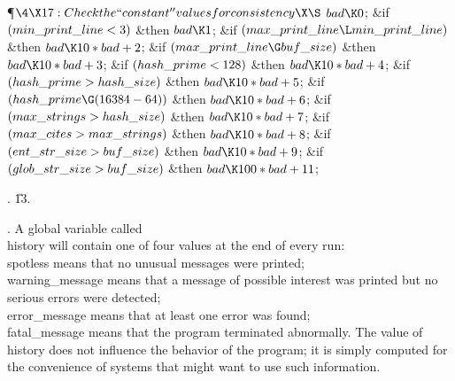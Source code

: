 \Y\P$\4\X17:Check the ``constant'' values for consistency\X\S$\6
$\\{bad}\K0$;\6
\&{if} $(\\{min\_print\_line}<3)$ \1\&{then}\5
$\\{bad}\K1$;\2\6
\&{if} $(\\{max\_print\_line}\L\\{min\_print\_line})$ \1\&{then}\5
$\\{bad}\K10\ast\\{bad}+2$;\2\6
\&{if} $(\\{max\_print\_line}\G\\{buf\_size})$ \1\&{then}\5
$\\{bad}\K10\ast\\{bad}+3$;\2\6
\&{if} $(\\{hash\_prime}<128)$ \1\&{then}\5
$\\{bad}\K10\ast\\{bad}+4$;\2\6
\&{if} $(\\{hash\_prime}>\\{hash\_size})$ \1\&{then}\5
$\\{bad}\K10\ast\\{bad}+5$;\2\6
\&{if} $(\\{hash\_prime}\G(16384-64))$ \1\&{then}\5
$\\{bad}\K10\ast\\{bad}+6$;\2\6
\&{if} $(\\{max\_strings}>\\{hash\_size})$ \1\&{then}\5
$\\{bad}\K10\ast\\{bad}+7$;\2\6
\&{if} $(\\{max\_cites}>\\{max\_strings})$ \1\&{then}\5
$\\{bad}\K10\ast\\{bad}+8$;\2\6
\&{if} $(\\{ent\_str\_size}>\\{buf\_size})$ \1\&{then}\5
$\\{bad}\K10\ast\\{bad}+9$;\2\6
\&{if} $(\\{glob\_str\_size}>\\{buf\_size})$ \1\&{then}\5
$\\{bad}\K100\ast\\{bad}+11$;\2\par
{}.
\U13.\fi

.
A global variable called \\{history} will contain one of four values at
the end of every run: \\{spotless} means that no unusual messages were
printed; \\{warning\_message} means that a message of possible interest
was printed but no serious errors were detected; \\{error\_message} means
that at least one error was found; \\{fatal\_message} means that the
program terminated abnormally. The value of \\{history} does not
influence the behavior of the program; it is simply computed for the
convenience of systems that might want to use such information.

